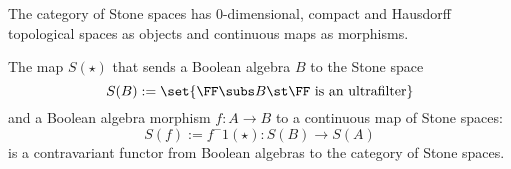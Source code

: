 \begin{dfn}
    The category of Stone spaces has
    $0$-dimensional, 
    compact and Hausdorff topological spaces as objects and 
    continuous maps as morphisms.
\end{dfn}

\begin{prop}
    The map
    $S(\star)$ that sends a Boolean algebra $B$ to the Stone space
    \[S(B) := \set{\FF \subs B \st \FF \text{ is an ultrafilter}}\]
    and a Boolean algebra morphism
    $f: A \to B$ to a continuous map of Stone spaces:
    \[S(f) := f^-1(\star) : S(B) \to S(A)\]
    is a contravariant functor from Boolean algebras to the category of Stone
    spaces.
\end{prop}
